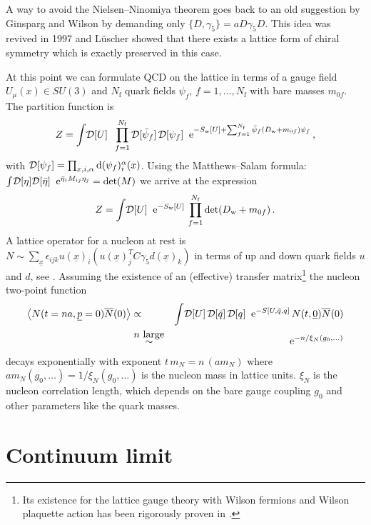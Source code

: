 \documentclass{PoS}
\newcommand{\ev}[1]{\left\langle #1 \right\rangle}
\newcommand{\SU}[1]{SU(#1)}
\newcommand{\gauge} [3][U]{\ensuremath{#1_{#2}(#3)}}
\newcommand{\Sw}{S_{\rm w}}
\newcommand{\rD}[1]{{\mathcal D}[#1]}
\def\Dw{D_{\mathrm{w}}}
\def\nf{N_{\mathrm{f}}}
\begin{document}
A way to avoid the Nielsen--Ninomiya theorem goes back to an old suggestion
by Ginsparg and Wilson \cite{Ginsparg:1981bj}
by demanding only $\{D,\gamma_5\} = aD\gamma_5D$.
This idea was revived in 1997 \cite{Hasenfratz:1998ri,Luscher:1998pqa,Neuberger:1997fp}
and L{\"u}scher showed that there exists
a lattice form of chiral symmetry which is exactly preserved in this case. 

At this point we can formulate QCD on the lattice in terms of a gauge field
$\gauge{\mu}{x}\in\SU{3}$ and $\nf$ quark fields 
$\psi_f$, $f=1,\ldots,\nf$ with bare masses $m_{0f}$. The partition function is
\begin{equation}
Z = \int\! \rD{U}\;\; \prod_{f=1}^{\nf} \rD{\bar{\psi}_f}\,\rD{\psi_f}\;\;
{\rm e}^{-\Sw[U]+\sum_{f=1}^{\nf}\bar{\psi}_f(\Dw+m_{0f})\psi_f} \,,
\end{equation}
with $\rD{\psi_f}=\prod_{x,i,\alpha} {\rm d}(\psi_f)^\alpha_i(x)$. Using the
Matthews--Salam formula: $\int\!  \rD{\eta} \rD{\bar\eta} \;\;
 {\rm e}^{\bar{\eta}_iM_{ij}\eta_j}
 = \det(M)$
we arrive at the expression
\begin{equation}\label{e:ZQCD}
Z = \int\! \rD{U}\;\; {\rm e}^{-\Sw[U]}\,\prod_{f=1}^{\nf}\det(\Dw+m_{0f}) \,.
\end{equation}
A lattice operator for a nucleon at rest is
$N\sim\sum_{\underline{x}}\epsilon_{ijk}u(\underline{x})_i\left(u(\underline{x})_j^TC\gamma_5d(\underline{x})_k\right)$
in terms of up and down quark fields $u$ and $d$, see \cite{Gattringer:2010zz}. 
Assuming the existence of an (effective) transfer matrix\footnote{
Its existence for the lattice gauge theory with Wilson fermions and
Wilson plaquette action has been rigorously proven in \cite{Luscher:1976ms}.}
the nucleon two-point function
\begin{eqnarray}\label{e:N2pt}
\ev{N(t=na,\underline{p}=0)\overline{N}(0)} & \propto &
\int\! \rD{U}\,\rD{\bar{q}}\,\rD{q}\;\; {\rm e}^{-S[U,\bar{q},q]}\,
N(t,\underline{0})\overline{N}(0) \\
& \stackrel{\mbox{$n$ large}}{\sim} & {\rm e}^{-n/\xi_N(g_0,\ldots)}
\end{eqnarray}
decays exponentially with exponent $t\,m_N=n\,(am_N)$ where
$am_N(g_0,\ldots)=1/\xi_N(g_0,\ldots)$ is the nucleon mass in lattice units.
$\xi_N$ is the nucleon correlation length, which depends on the 
bare gauge coupling $g_0$ and other parameters like the quark masses.

\section{Continuum limit}
\end{document}
